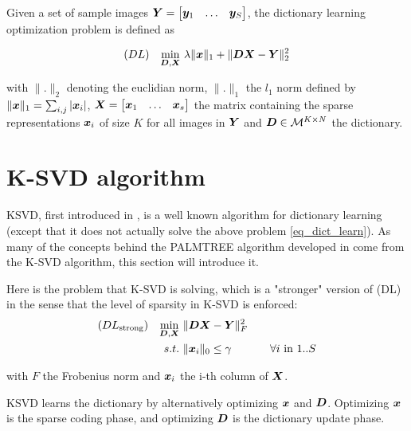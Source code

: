 Given a set of sample images $\displaystyle \bm Y = \begin{bmatrix} \bm y_1 & \dots & \bm y_S \end{bmatrix}$, the dictionary learning optimization problem is defined as

\begin{align}\label{eq_dict_learn}
	 (DL) && \underset{\bm D,\bm X}{\min}~ \lambda \lVert \bm x \rVert_1 + \lVert \bm D\bm X - \bm Y \rVert^2_2
\end{align} 

with $\lVert . \rVert_2$ denoting the euclidian norm, $\lVert . \rVert_1$ the $l_1$ norm defined by $\lVert \bm x \rVert_1 = \sum_{i,j} |\bm x_i|$, $\bm X = \begin{bmatrix} \bm x_1 & \dots & \bm x_s \end{bmatrix}$ the matrix containing the sparse representations $\bm x_i$ of size $K$ for all images in $\bm Y$ and $\bm D \in \mathcal{M}^{K \times N}$ the dictionary.

\section{K-SVD algorithm}

\ac{KSVD}, first introduced in \cite{aharon_k-svd:_2006}, is a well known algorithm for dictionary learning (except that it does not actually solve the above problem \cref{eq_dict_learn}). As many of the concepts behind the PALMTREE algorithm developed in \cite{chabiron_optimization_2016} come from the K-SVD algorithm, this section will introduce it. %

Here is the problem that K-SVD is solving, which is a "stronger" version of (DL) in the sense that the level of sparsity in K-SVD is enforced:
\begin{equation*}  \begin{aligned}
(DL_{\text{strong}}) && \underset{\bm D,\bm X}{\min}~ & \lVert \bm D\bm X-\bm Y \rVert^2_F \\
&& s.t.~& \lVert \bm x_i \rVert_0 \le \gamma & \quad \forall i \text{ in } 1..S
\end{aligned} \label{eq_ksvd} \end{equation*}

with $F$ the Frobenius norm and $\bm x_i$ the i-th column of $\bm X$.

\ac{KSVD} learns the dictionary by alternatively optimizing $\bm x$ and $\bm D$. Optimizing $\bm x$ is the sparse coding phase, and optimizing $\bm D$ is the dictionary update phase.

